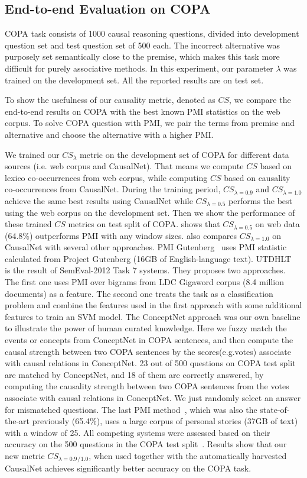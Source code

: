 \subsection{End-to-end Evaluation on COPA}
COPA task consists of 1000 causal reasoning questions, divided into
development question set and test question set of 500 each.
The incorrect alternative was purposely set semantically
close to the premise, which makes this task more difficult for
purely associative methods. In this experiment, our parameter $\lambda$
was trained on the development set.
All the reported results are on test set.

To show the usefulness of our causality metric, denoted as $CS$,
we compare the end-to-end results on COPA with the
best known PMI statistics on the web corpus.
To solve COPA question with PMI, we pair the terms from
premise and alternative and choose the alternative
with a higher PMI.

We trained our $CS_{\lambda}$ metric
on the development set of COPA
for different data sources (i.e. web corpus and CausalNet).
That means we compute $CS$ based on lexico co-occurrences from web corpus,
while computing $CS$ based on causality co-occurrences from CausalNet.
During the training period,
$CS_{\lambda=0.9}$ and $CS_{\lambda=1.0}$ achieve the same best results
using CausalNet while $CS_{\lambda=0.5}$
performs the best using the web corpus on the development set.
Then we show the performance of these trained $CS$ metrics on test split of COPA.
 shows that
$CS_{\lambda = 0.5}$ on web data
(64.8\%) outperforms PMI with any window sizes.
 also compares $CS_{\lambda=1.0}$ on CausalNet
with several other approaches.
PMI Gutenberg~\cite{roemmele2011choice} uses PMI statistic calculated
from Project Gutenberg (16GB of English-language text).
UTDHLT~\cite{goodwin2012utdhlt} is the
result of SemEval-2012 Task 7 systems. They proposes two
approaches. The first one uses PMI over bigrams from LDC Gigaword corpus
(8.4 million documents) as a
feature. The second one treats the task as a classification
problem and combine the features used in the first approach with
some additional features to train an SVM model.
The ConceptNet approach was our own baseline to illustrate the power of
human curated knowledge. Here we fuzzy match
the events or concepts from ConceptNet in COPA sentences, and then compute
the causal strength between two COPA sentences by the scores(e.g.votes)
associate with
causal relations in ConceptNet.
23 out of 500 questions
on COPA test split are matched by ConceptNet,
and 18 of them are correctly answered,
by computing the causality strength between two COPA sentences
from the votes associate with causal relations in ConceptNet.
We just randomly select an answer
for mismatched questions.
The last PMI method~\cite{gordon2011commonsense}, which was also the
state-of-the-art previously (65.4\%), uses a large corpus of
personal stories (37GB of text) with a window of 25.
All competing systems were assessed based
on their accuracy on the 500 questions in the COPA test
split~\cite{gordon2012copa}. Results show that our new metric
$CS_{\lambda=0.9}$$_{/}$$_{1.0}$,
when used together with the automatically harvested CausalNet
achieves significantly better accuracy on the COPA task.


